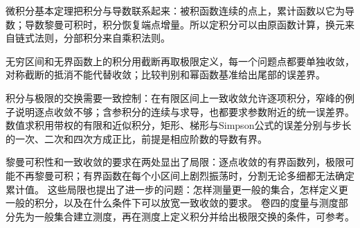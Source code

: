 微积分基本定理把积分与导数联系起来：被积函数连续的点上，累计函数以它为导数；导数黎曼可积时，积分恢复端点增量。所以定积分可以由原函数计算，换元来自链式法则，分部积分来自乘积法则。

无穷区间和无界函数上的积分用截断再取极限定义，每一个问题点都要单独收敛，对称截断的抵消不能代替收敛；比较判别和幂函数基准给出尾部的误差界。

积分与极限的交换需要一致控制：在有限区间上一致收敛允许逐项积分，窄峰的例子说明逐点收敛不够；含参积分的连续与求导，也都要求参数附近的统一误差界。
数值求积用带权的有限和近似积分，矩形、梯形与Simpson公式的误差分别与步长的一次、二次和四次方成正比，前提是相应阶数的导数有界。

黎曼可积性和一致收敛的要求在两处显出了局限：逐点收敛的有界函数列，极限可能不再黎曼可积；有界函数在每个小区间上剧烈振荡时，分割无论多细都无法确定累计值。
这些局限也提出了进一步的问题：怎样测量更一般的集合，怎样定义更一般的积分，以及在什么条件下可以放宽一致收敛的要求。
卷四的度量与测度部分先为一般集合建立测度，再在测度上定义积分并给出极限交换的条件，可参考。
